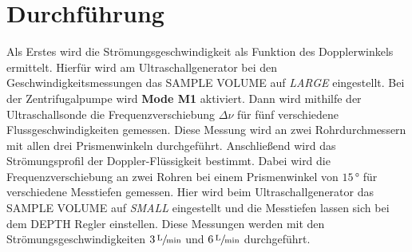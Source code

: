 \section{Durchführung}
\label{sec:Durchführung}
Als Erstes wird die Strömungsgeschwindigkeit als Funktion des Dopplerwinkels ermittelt. Hierfür
wird am Ultraschallgenerator bei den Geschwindigkeitsmessungen das SAMPLE VOLUME auf \textit{LARGE} eingestellt. Bei der Zentrifugalpumpe wird
\textbf{Mode M1} aktiviert. Dann wird mithilfe der Ultraschallsonde die Frequenzverschiebung $\Delta \nu$ für fünf verschiedene Flussgeschwindigkeiten gemessen.
Diese Messung wird an zwei Rohrdurchmessern mit allen drei Prismenwinkeln durchgeführt. 
Anschließend wird das Strömungsprofil der Doppler-Flüssigkeit bestimmt. Dabei wird die Frequenzverschiebung an zwei Rohren bei einem Prismenwinkel
von $15\,\unit{\degree}$ für verschiedene Messtiefen gemessen. Hier wird beim Ultraschallgenerator das SAMPLE VOLUME auf \textit{SMALL} eingestellt und die Messtiefen lassen sich bei dem DEPTH Regler
einstellen. Diese Messungen werden mit den Strömungsgeschwindigkeiten $3\,\sfrac{\unit{\liter}}{\unit{\minute}}$ und $6\,\sfrac{\unit{\liter}}{\unit{\minute}}$ durchgeführt.